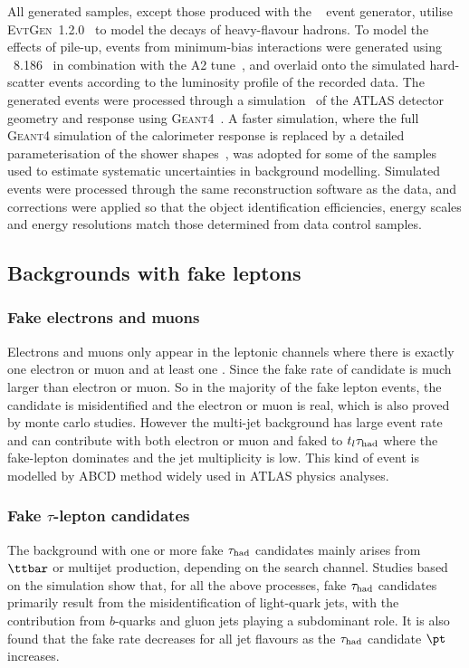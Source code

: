 All generated samples, except those produced with the {\sherpa}~\cite{Gleisberg:2008ta} event generator, 
utilise \textsc{EvtGen}~1.2.0~\cite{Lange:2001uf} to model the decays of heavy-flavour hadrons. 
To model the effects of pile-up, events from minimum-bias interactions were generated using {\pythia}~8.186~\cite{Sjostrand:2007gs}  
in combination with the A2 tune~\cite{ATL-PHYS-PUB-2011-014}, 
and overlaid onto the simulated hard-scatter events according to the luminosity profile of the recorded data. 
The generated events were processed through a simulation~\cite{Aad:2010ah} of the ATLAS detector geometry and response 
using \textsc{Geant4}~\cite{Agostinelli:2002hh}. A faster simulation, where the full \textsc{Geant4} simulation of
the calorimeter response is replaced by a detailed parameterisation of the shower shapes~\cite{FastCaloSim},
was adopted for some of the samples used to estimate systematic uncertainties in background modelling.
Simulated events were processed through the same reconstruction software as the data, and corrections were applied so that the object identification 
efficiencies, energy scales and energy resolutions match those determined from data control samples.

\subsection{Backgrounds with fake leptons}
\label{sec:fakeleptons}

\subsubsection{Fake electrons and muons}
Electrons and muons only appear in the leptonic channels where there is exactly one electron or muon and at least one \had. Since the fake rate of \had candidate is much larger than electron or muon. So in the majority of the fake lepton events, the \had candidate is misidentified and the electron or muon is real, which is also proved by monte carlo studies. However the multi-jet background has large event rate and can contribute with both electron or muon and \had faked to $t_l\tau_{\mathrm{had}}$ where the fake-lepton dominates and the jet multiplicity is low.  This kind of event is modelled by ABCD method widely used in ATLAS physics analyses.

\subsubsection{Fake $\tau$-lepton candidates}
\label{sec:faketaus}
The background with one or more fake $\tau_{\mathrm{had}}$ candidates mainly arises from $\ttbar$ or
multijet production, depending on the search channel. 
Studies based on the simulation show that, for all the above processes, fake $\tau_{\mathrm{had}}$ candidates primarily result from the 
misidentification of light-quark jets, with the contribution from $b$-quarks and gluon jets playing a subdominant role.
It is also found that the fake rate decreases for all jet flavours as the $\tau_{\mathrm{had}}$ candidate $\pt$ increases.


